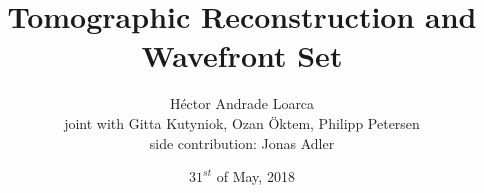 \title[AFG Oberseminar]{Tomographic Reconstruction and Wavefront Set}
\author[H\'ector Andrade Loarca (TUB)]{H\'ector Andrade Loarca\\
				\scriptsize{joint with Gitta Kutyniok, Ozan \"Oktem, Philipp Petersen}\\
				\scriptsize{side contribution: Jonas Adler}}
\date[31.05.2018]{$31^{st}$ of May, 2018}


\newcommand{\mylogo}{\texttt{[image: ./Images/AFG.pdf]}}

\begin{frame}[plain]
	\titlepage
\end{frame}

